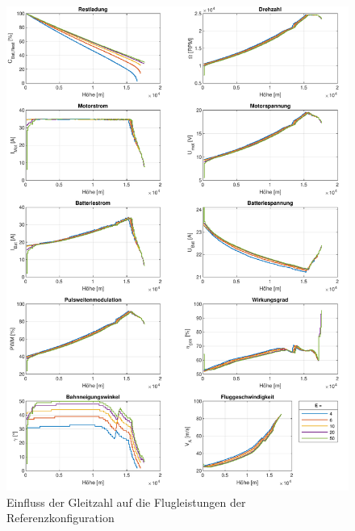 \begin{figure}[H]
\centering
	\includegraphics[scale=0.7]{Diagramme/Flaechenflzg_E.pdf}
	\caption{Einfluss der Gleitzahl auf die Flugleistungen der Referenzkonfiguration}
	\label{abb:gleitzahl}
\end{figure}


